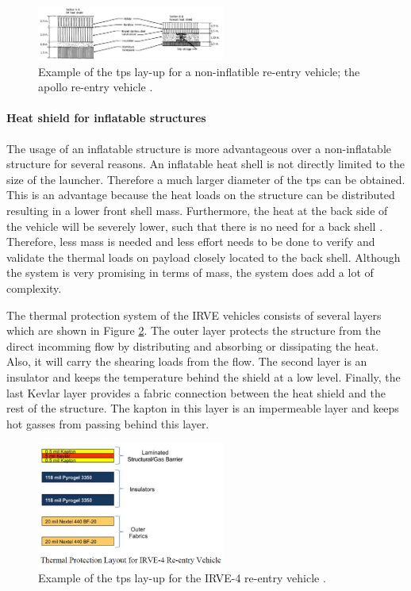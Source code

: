 \begin{figure}[H]
\centering
\includegraphics[width = 0.55\textwidth]{Figure/tpsApollo.png}
\caption{Example of the \gls{tps} lay-up for a non-inflatible re-entry vehicle; the apollo re-entry vehicle \cite[p.5]{Pavlosky1974}.}
\label{fig:tpslayupapollo}
\end{figure}

\paragraph{Heat shield for inflatable structures}
The usage of  an inflatable structure is more advantageous over a non-inflatable structure for several reasons. An inflatable heat shell is not directly limited to the size of the launcher. Therefore a much larger diameter of the \gls{tps} can be obtained. This is an advantage because the heat loads on the structure can be distributed resulting in a lower front shell mass. Furthermore, the heat at the back side of the vehicle will be severely lower, such that there is no need for a back shell \cite{Hughes2005}. Therefore, less mass is needed and less effort needs to be done to verify and validate the thermal loads on payload closely located to the back shell. Although the system is very promising in terms of mass, the system does add a lot of complexity. 

The thermal protection system of the IRVE vehicles consists of several layers \cite{Litton} which are shown in Figure \ref{fig:tpslayup}. The outer layer protects the structure from the direct incomming flow by distributing and absorbing or dissipating the heat. Also, it will carry the shearing loads from the flow. The second layer is an insulator and keeps the temperature behind the shield at a low level. Finally, the last Kevlar layer provides a fabric connection between the heat shield and the rest of the structure. The kapton in this layer is an impermeable layer and keeps hot gasses from passing behind this layer.

\begin{figure}[H]
\centering
\includegraphics[width = 0.55\textwidth]{Figure/IRVE4TPS.jpg}
\caption{Example of the \gls{tps} lay-up for the IRVE-4 re-entry vehicle \cite[p.6]{Litton}.}
\label{fig:tpslayup}
\end{figure}


